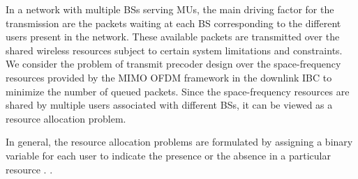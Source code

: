 
In a network with multiple \acp{BS} serving \acp{MU}, the main driving factor for the transmission are the packets waiting at each \ac{BS} corresponding to the different users present in the network. These available packets are transmitted over the shared wireless resources subject to certain system limitations and constraints. We consider the problem of transmit precoder design over the space-frequency resources provided by the \ac{MIMO} \ac{OFDM} framework in the downlink \ac{IBC} to minimize the number of queued packets. Since the space-frequency resources are shared by multiple users associated with different \acp{BS}, it can be viewed as a resource allocation problem.

In general, the resource allocation problems are formulated by assigning a binary variable for each user to indicate the presence or the absence in a particular resource \cite{admission_control}. .


